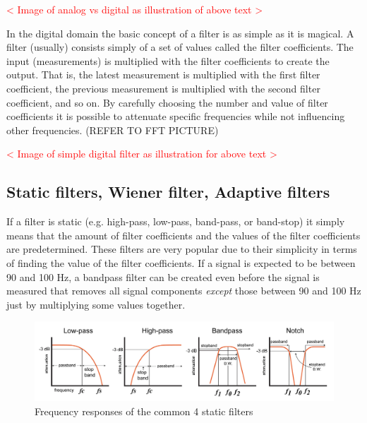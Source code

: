 \textcolor{red}{< Image of analog vs digital as illustration of above text >}

In the digital domain the basic concept of a filter is as simple as it is magical. A filter (usually) consists simply of a set of values called the filter coefficients. The input (measurements) is multiplied with the filter coefficients to create the output. That is, the latest measurement is multiplied with the first filter coefficient, the previous measurement is multiplied with the second filter coefficient, and so on. By carefully choosing the number and value of filter coefficients it is possible to attenuate specific frequencies while not influencing other frequencies. (REFER TO FFT PICTURE)

\textcolor{red}{< Image of simple digital filter as illustration for above text >}

\subsection{Static filters, Wiener filter, Adaptive filters}
If a filter is static (e.g. high-pass, low-pass, band-pass, or band-stop) it simply means that the amount of filter coefficients and the values of the filter coefficients are predetermined. These filters are very popular due to their simplicity in terms of finding the value of the filter coefficients. If a signal is expected to be between 90 and 100 Hz, a bandpass filter can be created even before the signal is measured that removes all signal components \textit{except} those between 90 and 100 Hz just by multiplying some values together. 

\begin{figure}[h!t]
	\begin{center}
		\includegraphics[width=1.0\columnwidth]{images/Davis_intro_to_filters_filter_types.png}
	\end{center}
	\caption{Frequency responses of the common 4 static filters \cite{intro_to_static_filters}}
	\label{fig:static_filters}
\end{figure}

